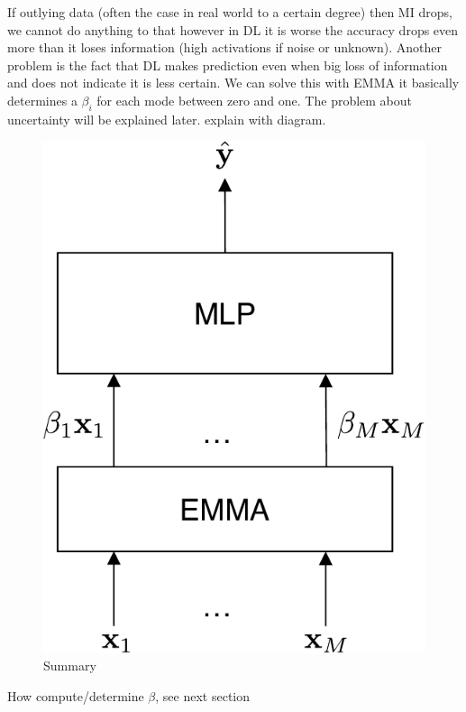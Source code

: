 If outlying data (often the case in real world to a certain degree) then MI drops, we cannot do anything to that however in DL it is worse the accuracy drops even more than it loses information (high activations if noise or unknown). Another problem is the fact that DL makes prediction even when big loss of information and does not indicate it is less certain. We can solve this with EMMA it basically determines a $\beta_i$ for each mode between zero and one. The problem about uncertainty will be explained later. explain with diagram.
\begin{figure}[!h]
\centering
\includegraphics[scale=0.5]{figures/mlp-with-emma}
\caption{Summary}	
\label{fig:summary}
\end{figure}

How compute/determine $\beta$, see next section


